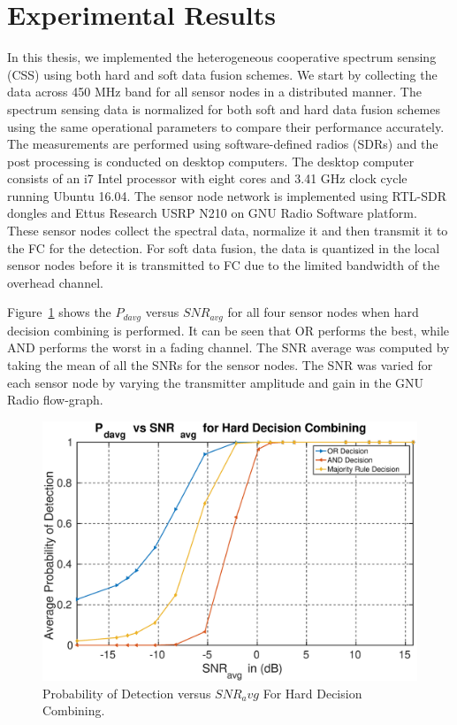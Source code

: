 \section{Experimental Results}
In this thesis, we implemented the heterogeneous cooperative spectrum sensing (CSS) using both hard and soft data fusion schemes. We start by collecting the data across 450 MHz band for all sensor nodes in a distributed manner. The spectrum sensing data is normalized for both soft and hard data fusion schemes using the same operational parameters to compare their performance accurately. The measurements are performed using software-defined radios (SDRs) and the post processing is conducted on desktop computers. The desktop computer consists of an i7 Intel processor with eight cores and 3.41 GHz clock cycle running Ubuntu 16.04. The sensor node network is implemented using RTL-SDR dongles and Ettus Research USRP N210 on GNU Radio Software platform.
These sensor nodes collect the spectral data, normalize it and then transmit it to the FC for the detection. For soft data fusion, the data is quantized in the local sensor nodes before it is transmitted to FC due to the limited bandwidth of the overhead channel. 

Figure~\ref{hardres} shows the $P_{davg}$ versus $SNR_{avg}$ for all four sensor nodes when hard decision combining is performed. It can be seen that OR performs the best, while AND performs the worst in a fading channel. The SNR average was computed by taking the mean of all the SNRs for the sensor nodes. The SNR was varied for each sensor node by varying the transmitter amplitude and gain in the GNU Radio flow-graph.

\begin{figure}[ht!]
	\centering
	\includegraphics[width=\textwidth,keepaspectratio]{images/Gill/figs/hardecisionpd.eps}
    \caption{Probability of Detection versus $SNR_avg$ For Hard Decision Combining.} 
\label{hardres}      
\end{figure}

